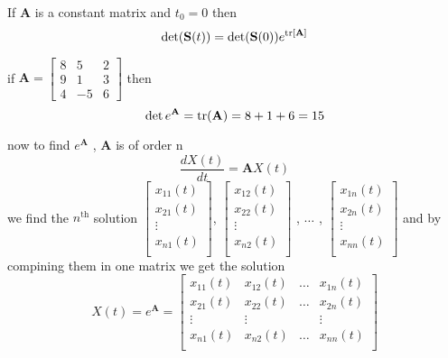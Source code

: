 \documentclass[]{article}
\begin{document}
If $\mathbf{A}$ is a constant matrix and $t_0=0$ then 
\[
    \det(\mathbf{S}(t)) = \det(\mathbf{S}(0))e^{\trace[\mathbf{A}]}
\]
\begin{example}
    if 
    \(
        \mathbf{A} = \begin{bmatrix}
            8 & 5 & 2\\
            9 & 1 & 3\\
            4 & -5 & 6
        \end{bmatrix}
    \)
    then 
    \[
        \det e^{\mathbf{A}} = \trace(\mathbf{A}) = 8+1+6 = 15
    \]
\end{example}
\newpage
now to find $e^{\mathbf{A}}$ , $\mathbf{A}$ is of order n
\[
    \frac{dX(t)}{dt}   = \mathbf{A}X(t)
\]
we find the $n^{\text{th}}$ solution
$
\begin{bmatrix}
    x_{11}(t)\\
    x_{21}(t)\\
    \vdots\\
    x_{n1}(t)\\
\end{bmatrix}
$,
$
\begin{bmatrix}
    x_{12}(t)\\
    x_{22}(t)\\
    \vdots\\
    x_{n2}(t)\\
\end{bmatrix}
$
,
$\dots$
,
$
\begin{bmatrix}
    x_{1n}(t)\\
    x_{2n}(t)\\
    \vdots\\
    x_{nn}(t)\\
\end{bmatrix}
$
and by compining them in one matrix we get the solution
\[
    X(t) = e^{\mathbf{A}} = \begin{bmatrix}
        x_{11}(t) & x_{12}(t) & \dots & x_{1n}(t)\\
        x_{21}(t) & x_{22}(t) & \dots & x_{2n}(t)\\
        \vdots &\vdots & &\vdots \\
        x_{n1}(t) & x_{n2}(t) & \dots & x_{nn}(t)\\
    \end{bmatrix}  
\]
\end{document}
